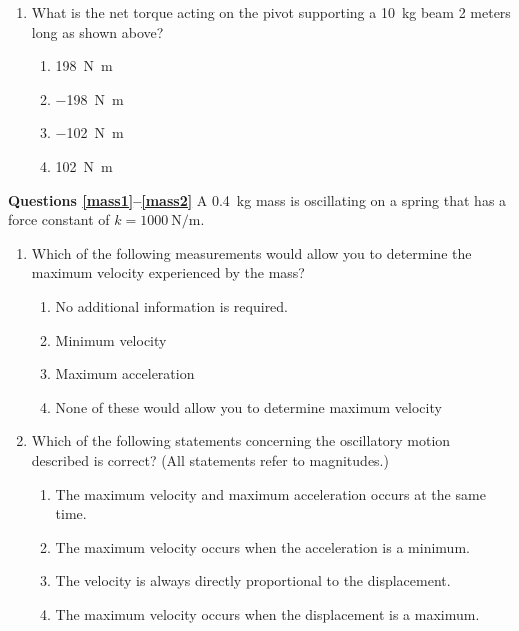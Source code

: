 \documentclass[11pt]{article}
\begin{document}
\begin{multicols}{2}
\begin{enumerate}[leftmargin=18pt,resume]
    \begin{center}
    \end{center}
    
  \item What is the net torque acting on the pivot supporting a
    \SI{10}{\kilo\gram} beam 2 meters long as shown above?
    \begin{enumerate}[nosep,leftmargin=18pt,label=(\Alph*)]
    \item\SI{198}{\newton.\metre}
    \item\SI{-198}{\newton.\metre}
    \item\SI{-102}{\newton.\metre}
    \item\SI{102}{\newton.\metre}
    \end{enumerate}
  \end{enumerate}
  \columnbreak
  
  \textbf{Questions \ref{mass1}--\ref{mass2}} A \SI{.4}{\kilo\gram} mass is
  oscillating on a spring that has a force constant of
  $k=\SI{1000}{\newton\per\metre}$.
  \begin{enumerate}[leftmargin=18pt,resume]
  \item Which of the following measurements would allow you to determine the
    maximum velocity experienced by the mass?
    \label{mass1}
    \begin{enumerate}[nosep,leftmargin=18pt,label=(\Alph*)]
    \item No additional information is required.
    \item Minimum velocity
    \item Maximum acceleration
    \item None of these would allow you to determine maximum velocity
    \end{enumerate}
    \vspace{.7in}
    
  \item Which of the following statements concerning the oscillatory motion
    described is correct? (All statements refer to magnitudes.)
    \label{mass2}
    \begin{enumerate}[nosep,leftmargin=18pt,label=(\Alph*)]
    \item The maximum velocity and maximum acceleration occurs at the same time.
    \item The maximum velocity occurs when the acceleration is a minimum.
    \item The velocity is always directly proportional to the displacement.
    \item The maximum velocity occurs when the displacement is a maximum.
    \end{enumerate}
    \vspace{.7in}


\end{enumerate}
\end{multicols}
\end{document}
